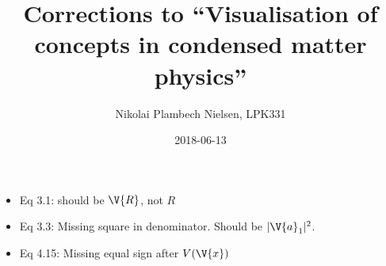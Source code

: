 \documentclass[a4paper,11pt]{article}
\title{Corrections to ``Visualisation of concepts in condensed matter physics''}
\author{Nikolai Plambech Nielsen, LPK331}
\date{2018-06-13}
\numberwithin{equation}{section}
\begin{document}
	\maketitle
	\begin{itemize}
		\item Eq 3.1: should be $ \V{R} $, not $ R $
		\item Eq 3.3: Missing square in denominator. Should be $ |\V{a}_1|^2 $.
		\item Eq 4.15: Missing equal sign after $ V(\V{x}) $
	\end{itemize}
	
\end{document}
